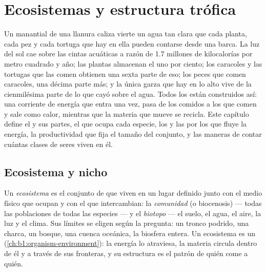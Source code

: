 \chapter{Ecosistemas y estructura trófica}\label{ch:b1:ecosystem-organization}

Un manantial de una llanura caliza vierte un agua tan clara que cada planta,
cada pez y cada tortuga que hay en ella pueden contarse desde una barca. La
luz del sol cae sobre las cintas acuáticas a razón de \qty{1.7}{} millones
de kilocalorías por metro cuadrado y año; las plantas almacenan el uno por
ciento; los caracoles y las tortugas que las comen obtienen una sexta parte
de eso; los peces que comen caracoles, una décima parte más; y la única
garza que hay en lo alto vive de la cienmilésima parte de lo que cayó sobre
el agua. Todos los  están construidos así: una corriente de
energía que entra una vez, pasa de los comidos a los que comen y sale como
calor, mientras que la materia que mueve se recicla. Este capítulo define el
 y sus partes, el  que ocupa cada especie, los  y las  por los que fluye la energía, la
productividad que fija el tamaño del conjunto, y las maneras de contar
cuántas clases de seres viven en él.

\section{Ecosistema y nicho}

\begin{definition}\label{def:b1:ecosystem-organization:ecosystem}
Un \emph{ecosistema} es el conjunto de  que viven en un lugar
definido junto con el medio físico que ocupan y con el que intercambian: la
\emph{comunidad} (o biocenosis) --- todas las poblaciones de todas las
especies --- y el \emph{biotopo} --- el suelo, el agua, el aire, la luz y el
clima. Sus límites se eligen según la pregunta: un tronco podrido, una
charca, un bosque, una cuenca oceánica, la biosfera entera. Un ecosistema es
un  (\cref{ch:b1:organism-environment}): la energía lo
atraviesa, la materia circula dentro de él y a través de sus fronteras, y su
estructura es el patrón de quién come a quién.
\end{definition}


